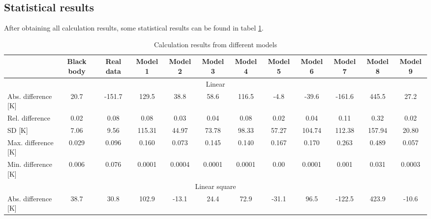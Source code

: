 \subsection{Statistical results}

After obtaining all calculation results, some statistical results can be found in 
tabel \ref{tab: statistic_results}. 

\begin{table}
    \centering
    \caption{Calculation results from different models}
    \label{tab: statistic_results}
    \begin{tabular}{lccccccccccc}
        \hline
        & \multicolumn{1}{c}{Black body} & \multicolumn{1}{c}{Real data} & Model 1 & Model 2 & Model 3 & Model 4 & Model 5 & Model 6 & Model 7 & Model 8 & Model 9 \\ \hline
        \multicolumn{12}{c}{Linear}                                                                                                                                                         \\ \hline
        Abs. difference {[}K{]} & 20.7                           & -151.7                        & 129.5   & 38.8    & 58.6    & 116.5   & -4.8    & -39.6   & -161.6  & 445.5   & 27.2     \\
        Rel. difference         & 0.02                           & 0.08                          & 0.08    & 0.03    & 0.04    & 0.08    & 0.02    & 0.04    & 0.11    & 0.32    & 0.02     \\
        SD {[}K{]}              & 7.06                           & 9.56                          & 115.31  & 44.97   & 73.78   & 98.33   & 57.27   & 104.74  & 112.38  & 157.94  & 20.80    \\
        Max. difference {[}K{]} & 0.029                          & 0.096                         & 0.160   & 0.073   & 0.145   & 0.140   & 0.167   & 0.170   & 0.263   & 0.489   & 0.057    \\
        Min. difference {[}K{]} & 0.006                          & 0.076                         & 0.0001  & 0.0004  & 0.0001  & 0.0001  & 0.00    & 0.0001  & 0.001   & 0.031   & 0.0003   \\ \hline
        \multicolumn{12}{c}{Linear square}                                                                                                                                                   \\ \hline
        Abs. difference {[}K{]} & 38.7                           & 30.8                          & 102.9   & -13.1   & 24.4    & 72.9    & -31.1   & 96.5    & -122.5  & 423.9   & -10.6   \\

\end{tabular}
\end{table}
